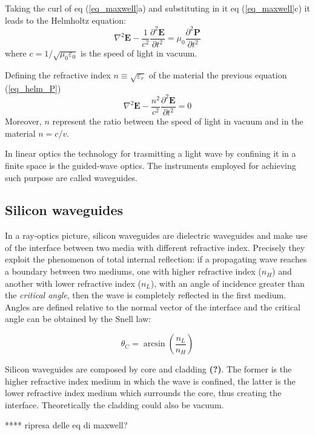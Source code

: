 \documentclass[12pt,a4paper,twoside]{article}
\begin{document}
Taking the curl of eq (\ref{eq_maxwell}a) and substituting in it eq (\ref{eq_maxwell}c) it leads to the Helmholtz equation:
\begin{equation}
\nabla^2 \textbf{E} - \frac{1}{c^2}\frac{\partial^2 \textbf{E}}{\partial t^2} = \mu_0\frac{\partial^2 \textbf{P}}{\partial t^2}
\label{eq_helm_P}
\end{equation}
where $c = 1/\sqrt{\mu_0 \varepsilon_0}$ is the speed of light in vacuum.

Defining the refractive index $n \equiv \sqrt{\varepsilon_r}$ of the material the previous equation (\ref{eq_helm_P})
\begin{equation}
\nabla^2 \textbf{E} - \frac{n^2}{c^2}\frac{\partial^2 \textbf{E}}{\partial t^2} = 0
\end{equation}
Moreover, $n$ represent the ratio between the speed of light in vacuum and in the material $n = c/v$.

In linear optics the technology for trasmitting a light wave by confining it in a finite space is the guided-wave optics.
The instruments employed for achieving such purpose are called waveguides.

\subsection{Silicon waveguides}
In a ray-optics picture, silicon waveguides are dielectric waveguides and make use of the interface between two media with different refractive index.
Precisely they exploit the phenomenon of total internal reflection: if a propagating wave reaches a boundary between two mediums, one with higher refractive index ($n_H$) and another with lower refractive index ($n_L$), with an angle of incidence greater than the \textit{critical angle}, then the wave is completely reflected in the first medium.
Angles are defined relative to the normal vector of the interface and the critical angle can be obtained by the Snell law:

$$	\theta_C = \arcsin \left( \frac{n_L}{n_H} \right)$$

Silicon waveguides are composed by core and cladding \textbf{(?)}. %
The former is the higher refractive index medium in which the wave is confined, the latter is the lower refractive index medium which surrounds the core, thus creating the interface. Theoretically the cladding could also be vacuum.

\vspace{18pt}
**** ripresa delle eq di maxwell?
\vspace{12pt}
\end{document}
